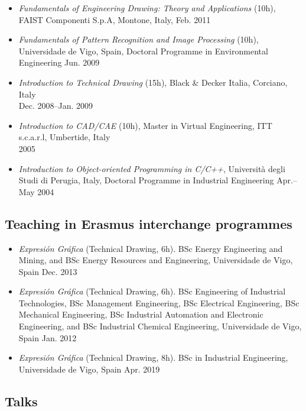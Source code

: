 \documentclass[11pt]{article}
\begin{document}
\begin{itemize}
	\item \emph{Fundamentals of Engineering Drawing: Theory and Applications} (10h), FAIST Componenti S.p.A, Montone, Italy, \mbox{} \hfill Feb. 2011
	\item \emph{Fundamentals of Pattern Recognition and Image Processing} (10h), Universidade de Vigo, Spain, Doctoral Programme in Environmental Engineering \mbox{} \hfill Jun. 2009
	\item \emph{Introduction to Technical Drawing} (15h), Black \& Decker Italia, Corciano, Italy \\ \mbox{}  \hfill Dec. 2008--Jan. 2009
	\item \emph{Introduction to CAD/CAE} (10h), Master in Virtual Engineering, ITT s.c.a.r.l, Umbertide, Italy \\ \mbox{} \hfill 2005
	\item \emph{Introduction to Object-oriented Programming in C/C++}, Università degli Studi di Perugia, Italy, Doctoral Programme in Industrial Engineering \mbox{} \hfill Apr.--May 2004
\end{itemize}

\subsection*{Teaching in Erasmus interchange programmes}

\begin{itemize}
	\item \emph{Expresión Gráfica} (Technical Drawing, 6h). BSc Energy Engineering and Mining, and BSc Energy Resources and Engineering, Universidade de Vigo, Spain \hfill Dec. 2013 
	\item \emph{Expresión Gráfica} (Technical Drawing, 6h). BSc Engineering of Industrial Technologies, BSc Management Engineering, BSc Electrical Engineering, BSc Mechanical Engineering, BSc Industrial Automation and Electronic Engineering, and BSc Industrial Chemical Engineering, Universidade de Vigo, Spain \hfill Jan. 2012
	\item \emph{Expresión Gráfica} (Technical Drawing, 8h). BSc in Industrial Engineering, Universidade de Vigo, Spain \hfill Apr. 2019
\end{itemize}

\subsection*{Talks}
\end{document}
